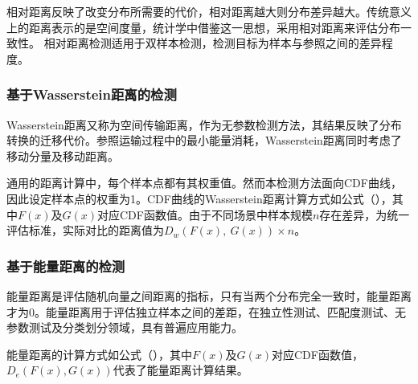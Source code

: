 相对距离反映了改变分布所需要的代价，相对距离越大则分布差异越大。传统意义上的距离表示的是空间度量，统计学中借鉴这一思想，采用相对距离来评估分布一致性。
相对距离检测适用于双样本检测，检测目标为样本与参照之间的差异程度。

\subsubsection{基于Wasserstein距离的检测}
\label{chap:analyze:statistical:distance:wasserstein}

Wasserstein距离又称为空间传输距离，作为无参数检测方法，其结果反映了分布转换的迁移代价。参照运输过程中的最小能量消耗，Wasserstein距离同时考虑了移动分量及移动距离。

通用的距离计算中，每个样本点都有其权重值。然而本检测方法面向CDF曲线，因此设定样本点的权重为1。CDF曲线的Wasserstein距离计算方式如公式（），其中$F(x)$及$G(x)$对应CDF函数值。由于不同场景中样本规模$n$存在差异，为统一评估标准，实际对比的距离值为$D_{w}(F(x),\ G(x))\times n$。

\subsubsection{基于能量距离的检测}
\label{chap:analyze:statistical:distance:energy}

能量距离是评估随机向量之间距离的指标，只有当两个分布完全一致时，能量距离才为0。能量距离用于评估独立样本之间的差距，在独立性测试、匹配度测试、无参数测试及分类划分领域，具有普遍应用能力。

能量距离的计算方式如公式（），其中$F(x)$及$G(x)$对应CDF函数值，$D_{e}(F(x),G(x))$代表了能量距离计算结果。

